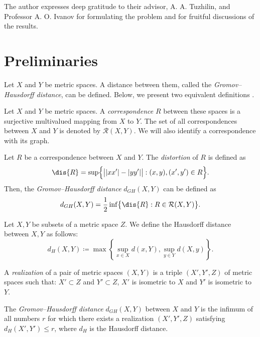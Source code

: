 \documentclass[leqno]{article}
\begin{document}
The author expresses deep gratitude to their advisor, A. A. Tuzhilin, and Professor A. O. Ivanov for formulating the problem and for fruitful discussions of the results. 

\section{Preliminaries}

Let $ X $ and $ Y $ be metric spaces. A distance between them, called the \emph{Gromov--Hausdorff distance}, can be defined. Below, we present two equivalent definitions \cite{Lectures}.

\begin{defin}  
Let $ X $ and $ Y $ be metric spaces. A \emph{correspondence} $ R $ between these spaces is a surjective multivalued mapping from $ X $ to $ Y $. The set of all correspondences between $ X $ and $ Y $ is denoted by $ \mathcal{R}(X,Y) $. We will also identify a correspondence with its graph.  
\end{defin}

\begin{defin}  
Let $ R $ be a correspondence between $ X $ and $ Y $. The \emph{distortion} of $ R $ is defined as  
$$
\dis{R} = \sup \Bigl\{ \big| |xx'| - |yy'| \big| : (x, y), (x', y') \in R \Bigr\}.  
$$  
Then, the \emph{Gromov--Hausdorff distance} $ d_{GH}(X,Y) $ can be defined as  
$$
d_{GH}(X,Y) = \frac{1}{2} \inf \bigl\{ \dis{R} : R \in \mathcal{R}(X,Y) \bigr\}.  
$$  
\label{defSootvet}  
\end{defin}
\begin{defin}
  Let $X,Y$ be subsets of a metric space $Z$. We define the Hausdorff distance between $X,Y$ as follows:
  $$
  d_H(X, Y) \coloneqq \max \left\{ \sup_{x \in X} d(x, Y), \sup_{y \in Y} d(X, y) \right\}.
  $$
\end{defin}
\begin{defin}  
A \emph{realization} of a pair of metric spaces $ (X,Y) $ is a triple $ (X', Y', Z) $ of metric spaces such that:  
$ X' \subset Z $ and $ Y' \subset Z $,  
$ X' $ is isometric to $ X $ and 
$ Y' $ is isometric to $ Y $.  

The \emph{Gromov--Hausdorff distance} $ d_{GH}(X,Y) $ between $ X $ and $ Y $ is the infimum of all numbers $ r $ for which there exists a realization $ (X', Y', Z) $ satisfying $ d_H(X', Y') \leq r $, where $ d_H $ is the Hausdorff distance.  
\end{defin}  
\end{document}
